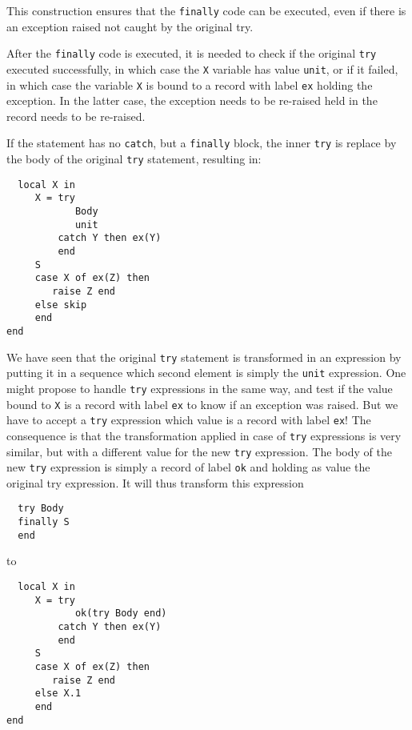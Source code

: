 \documentclass[a4paper]{memoir}
\begin{document}
This construction ensures that the \lstinline!finally! code can be executed,
even if there is an exception raised not caught by the original try.

After the \lstinline!finally! code is executed, it is needed to check if the
original \lstinline!try! executed successfully, in which case the \lstinline!X!
variable has value \lstinline!unit!, or if it failed, in which case the variable
\lstinline!X! is bound to a record with label \lstinline!ex! holding the
exception. In the latter case, the exception needs to be re-raised held in the
record needs to be re-raised.

If the statement has no \lstinline!catch!, but a \lstinline!finally! block, the
inner \lstinline!try! is replace by the body of the original \lstinline!try!
statement, resulting in:
\begin{lstlisting}
  local X in 
     X = try 
            Body
            unit 
         catch Y then ex(Y)
         end 
     S 
     case X of ex(Z) then 
        raise Z end 
     else skip 
     end 
end  
\end{lstlisting}


We have seen that the original \lstinline!try! statement is transformed in an
expression by putting it in a sequence which second element is simply the
\lstinline!unit! expression. One might propose to handle \lstinline!try!
expressions in the same way, and test if the value bound to \lstinline!X! is a
record with label \lstinline!ex! to know if an exception was raised. 
But we have to accept a \lstinline!try! expression which
value is a record with label \lstinline!ex!! The consequence is that the
transformation applied in case of \lstinline!try! expressions is very similar, 
but with a different value for the new \lstinline!try! expression.
The body of the new \lstinline!try! expression is simply a record of label
\lstinline!ok! and holding as value the original try expression.
It will thus transform this expression
\begin{lstlisting}
  try Body
  finally S 
  end
\end{lstlisting}

to

\begin{lstlisting}
  local X in 
     X = try 
            ok(try Body end)
         catch Y then ex(Y)
         end 
     S 
     case X of ex(Z) then 
        raise Z end 
     else X.1 
     end 
end  
\end{lstlisting}
\end{document}
